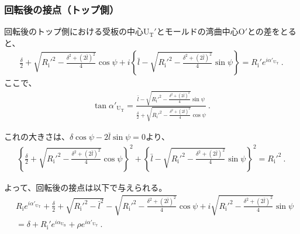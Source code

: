\subsubsection{回転後の接点（トップ側）}
回転後のトップ側における受板の中心U$_\mathrm T'$とモールドの湾曲中心O$'$との差をとると、
\begin{align*}
  \frac\delta2+\sqrt{R_\mathrm i'^2-\frac{\delta^2+(2\bar l)^2}4}\cos\psi
  +i\left\{\bar l-\sqrt{R_\mathrm i'^2-\frac{\delta^2+(2\bar l)^2}4}\sin\psi\right\}
  = R_\mathrm i'e^{i\alpha'_{\mathrm U_\mathrm T}}\ .
\end{align*}
ここで、
\begin{align*}
  \tan\alpha'_{\mathrm U_\mathrm T}
  = \frac{\displaystyle\bar l-\sqrt{R_\mathrm i'^2-\frac{\delta^2+(2\bar l)^2}4}\sin\psi}
         {\displaystyle\frac\delta2+\sqrt{R_\mathrm i'^2-\frac{\delta^2+(2\bar l)^2}4}\cos\psi}\ .
\end{align*}
\begin{hosoku}
これの大きさは、$\delta\cos\psi-2\bar l\sin\psi = 0$より、
\begin{align*}
  \left\{\frac\delta2+\sqrt{R_\mathrm i'^2-\frac{\delta^2+(2\bar l)^2}4}\cos\psi\right\}^{\!\!2}
  +\left\{\bar l-\sqrt{R_\mathrm i'^2-\frac{\delta^2+(2\bar l)^2}4}\sin\psi\right\}^{\!\!2}
  = R_\mathrm i'^2\ .
\end{align*}
\end{hosoku}
よって、回転後の接点は以下で与えられる。
\begin{align*}
  &  R_\mathrm ie^{i\alpha'_{\mathrm U_\mathrm T}}
     +\frac\delta2+\sqrt{R_\mathrm i'^2-\bar l^2}-\sqrt{R_\mathrm i'^2-\frac{\delta^2+(2\bar l)^2}4}\cos\psi
     +i\sqrt{R_\mathrm i'^2-\frac{\delta^2+(2\bar l)^2}4}\sin\psi\\
  &= \delta+R_\mathrm i'e^{i\alpha_{\mathrm U_\mathrm B}}+\rho e^{i\alpha'_{\mathrm U_\mathrm T}}\ .
\end{align*}


